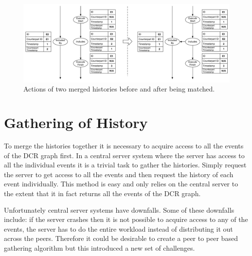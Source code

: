 	\begin{figure}[H]
		\centering
		\includegraphics[width=\textwidth]{4connect/images/match-before-after.pdf}
		\caption{Actions of two merged histories before and after being matched.}
		\label{fig:connecting:match-before-after}
	\end{figure}
	
	
    
    \section{Gathering of History}
   
    To merge the histories together it is necessary to acquire access to all the events of the DCR graph first. In a central server system where the server has access to all the individual events it is a trivial task to gather the histories. Simply request the server to get access to all the events and then request the history of each event individually. This method is easy and only relies on the central server to the extent that it in fact returns all the events of the DCR graph. 
    
    Unfortunately central server systems have downfalls. Some of these downfalls include: if the server crashes then it is not possible to acquire access to any of the events, the server has to do the entire workload instead of distributing it out across the peers. Therefore it could be desirable to create a peer to peer based gathering algorithm but this introduced a new set of challenges.
    
